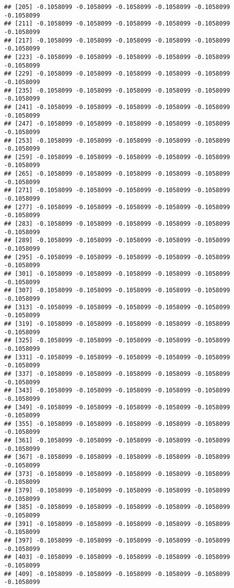 \documentclass[
]{article}
\begin{document}
\begin{verbatim}
## [205] -0.1058099 -0.1058099 -0.1058099 -0.1058099 -0.1058099 -0.1058099
## [211] -0.1058099 -0.1058099 -0.1058099 -0.1058099 -0.1058099 -0.1058099
## [217] -0.1058099 -0.1058099 -0.1058099 -0.1058099 -0.1058099 -0.1058099
## [223] -0.1058099 -0.1058099 -0.1058099 -0.1058099 -0.1058099 -0.1058099
## [229] -0.1058099 -0.1058099 -0.1058099 -0.1058099 -0.1058099 -0.1058099
## [235] -0.1058099 -0.1058099 -0.1058099 -0.1058099 -0.1058099 -0.1058099
## [241] -0.1058099 -0.1058099 -0.1058099 -0.1058099 -0.1058099 -0.1058099
## [247] -0.1058099 -0.1058099 -0.1058099 -0.1058099 -0.1058099 -0.1058099
## [253] -0.1058099 -0.1058099 -0.1058099 -0.1058099 -0.1058099 -0.1058099
## [259] -0.1058099 -0.1058099 -0.1058099 -0.1058099 -0.1058099 -0.1058099
## [265] -0.1058099 -0.1058099 -0.1058099 -0.1058099 -0.1058099 -0.1058099
## [271] -0.1058099 -0.1058099 -0.1058099 -0.1058099 -0.1058099 -0.1058099
## [277] -0.1058099 -0.1058099 -0.1058099 -0.1058099 -0.1058099 -0.1058099
## [283] -0.1058099 -0.1058099 -0.1058099 -0.1058099 -0.1058099 -0.1058099
## [289] -0.1058099 -0.1058099 -0.1058099 -0.1058099 -0.1058099 -0.1058099
## [295] -0.1058099 -0.1058099 -0.1058099 -0.1058099 -0.1058099 -0.1058099
## [301] -0.1058099 -0.1058099 -0.1058099 -0.1058099 -0.1058099 -0.1058099
## [307] -0.1058099 -0.1058099 -0.1058099 -0.1058099 -0.1058099 -0.1058099
## [313] -0.1058099 -0.1058099 -0.1058099 -0.1058099 -0.1058099 -0.1058099
## [319] -0.1058099 -0.1058099 -0.1058099 -0.1058099 -0.1058099 -0.1058099
## [325] -0.1058099 -0.1058099 -0.1058099 -0.1058099 -0.1058099 -0.1058099
## [331] -0.1058099 -0.1058099 -0.1058099 -0.1058099 -0.1058099 -0.1058099
## [337] -0.1058099 -0.1058099 -0.1058099 -0.1058099 -0.1058099 -0.1058099
## [343] -0.1058099 -0.1058099 -0.1058099 -0.1058099 -0.1058099 -0.1058099
## [349] -0.1058099 -0.1058099 -0.1058099 -0.1058099 -0.1058099 -0.1058099
## [355] -0.1058099 -0.1058099 -0.1058099 -0.1058099 -0.1058099 -0.1058099
## [361] -0.1058099 -0.1058099 -0.1058099 -0.1058099 -0.1058099 -0.1058099
## [367] -0.1058099 -0.1058099 -0.1058099 -0.1058099 -0.1058099 -0.1058099
## [373] -0.1058099 -0.1058099 -0.1058099 -0.1058099 -0.1058099 -0.1058099
## [379] -0.1058099 -0.1058099 -0.1058099 -0.1058099 -0.1058099 -0.1058099
## [385] -0.1058099 -0.1058099 -0.1058099 -0.1058099 -0.1058099 -0.1058099
## [391] -0.1058099 -0.1058099 -0.1058099 -0.1058099 -0.1058099 -0.1058099
## [397] -0.1058099 -0.1058099 -0.1058099 -0.1058099 -0.1058099 -0.1058099
## [403] -0.1058099 -0.1058099 -0.1058099 -0.1058099 -0.1058099 -0.1058099
## [409] -0.1058099 -0.1058099 -0.1058099 -0.1058099 -0.1058099 -0.1058099

\end{verbatim}
\end{document}
